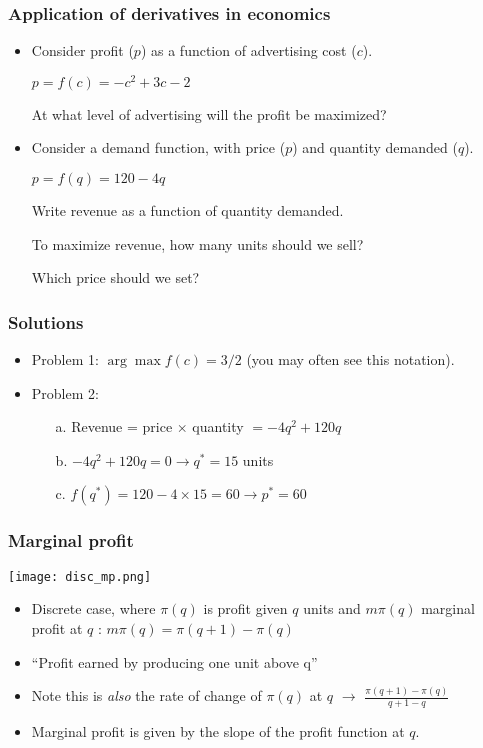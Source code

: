 \documentclass[xcolor=dvipsnames]{beamer} %
\begin{document}
\begin{frame}
\frametitle{Application of derivatives in economics}
\begin{itemize}
    \itemsep\setlength{1em}
\item Consider profit ($p$) as a function of advertising cost ($c$). 
\item[] \textcolor{dark_red}{$p = f(c) = -c^2 + 3c -2 $}
\item[] At what level of advertising will the profit be maximized? 
\item Consider a demand function, with price ($p$) and quantity demanded ($q$).
\item[] \textcolor{dark_red}{$p = f(q) = 120 - 4q$}
\item[] Write revenue as a function of quantity demanded. 
\item[] To maximize revenue, how many units should we sell? 
\item[] Which price should we set?
\end{itemize}
\end{frame}

\begin{frame}
\frametitle{Solutions}
\begin{itemize}
\item Problem 1: $\arg \max f(c) = 3/2$ (you may often see this notation).
\item Problem 2:
\begin{itemize}
\item[a.] Revenue = price $\times$ quantity $= -4q^2 + 120q$ 
\item[b.] $-4q^2 + 120q = 0 \rightarrow q^* = 15$ units 
\item[c.] $f(q^*) = 120 - 4 \times 15 = 60 \rightarrow p^* = 60$
\end{itemize}
\end{itemize}
\end{frame}

\begin{frame}
\frametitle{Marginal profit}
\begin{scriptsize}
\begin{center}
\texttt{[image: disc\_mp.png]}
\end{center}
\begin{itemize}
     \itemsep\setlength{1em}
\item Discrete case, where $\pi(q)$ is profit given $q$ units and $m \pi(q)$ marginal profit at $q$ : $ m\pi (q) = \pi (q + 1) - \pi (q)$
\item ``Profit earned by producing one unit above q''
\item Note this is \emph{also} the rate of change of $\pi(q)$ at $q$ $\rightarrow$ $\frac{\pi(q+1) - \pi(q)}{q + 1 - q}$
\item Marginal profit is given by the \textcolor{dark_red}{slope} of the profit function at $q$.
\end{itemize}
\end{scriptsize}
\end{frame}
\end{document}
